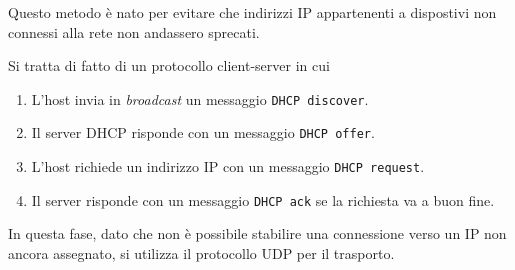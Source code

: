 Questo metodo è nato per evitare che indirizzi IP appartenenti a dispostivi non connessi alla rete
non andassero sprecati.

Si tratta di fatto di un protocollo client-server in cui
\begin{enumerate}
	\item L'host invia in \emph{broadcast} un messaggio \verb|DHCP discover|.
	\item Il server DHCP risponde con un messaggio \verb|DHCP offer|.
	\item L'host richiede un indirizzo IP con un messaggio \verb|DHCP request|.
	\item Il server risponde con un messaggio \verb|DHCP ack| se la richiesta va a buon fine.
\end{enumerate}
In questa fase, dato che non è possibile stabilire una connessione verso un IP non ancora 
assegnato, si utilizza il protocollo UDP per il trasporto.
